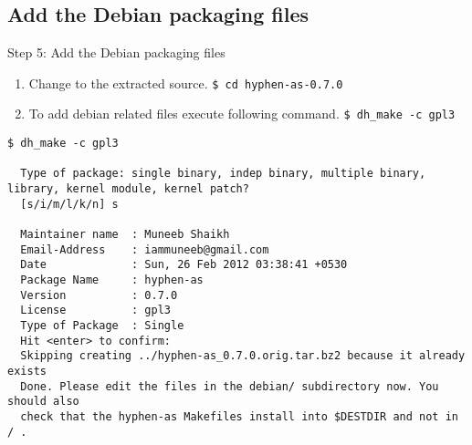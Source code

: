 \documentclass[red,10pt,a4paper]{beamer}
\begin{document}
\subsection{Add the Debian packaging files}

\begin{frame}[fragile]{Step 5: Add the Debian packaging files}

\begin{enumerate}
 \item Change to the extracted source. \newline
 \lstinline|$ cd hyphen-as-0.7.0|
 \hbr
 \item To add debian related files execute following command.
   \lstinline|$ dh_make -c gpl3|
 
\end{enumerate}

 \begin{lstlisting}[basicstyle=\tiny\ttfamily, ]
  $ dh_make -c gpl3

  Type of package: single binary, indep binary, multiple binary, library, kernel module, kernel patch?
  [s/i/m/l/k/n] s

  Maintainer name  : Muneeb Shaikh
  Email-Address    : iammuneeb@gmail.com 
  Date             : Sun, 26 Feb 2012 03:38:41 +0530
  Package Name     : hyphen-as
  Version          : 0.7.0
  License          : gpl3
  Type of Package  : Single
  Hit <enter> to confirm: 
  Skipping creating ../hyphen-as_0.7.0.orig.tar.bz2 because it already exists
  Done. Please edit the files in the debian/ subdirectory now. You should also
  check that the hyphen-as Makefiles install into $DESTDIR and not in / .

 \end{lstlisting}
 
\end{frame}
\end{document}
